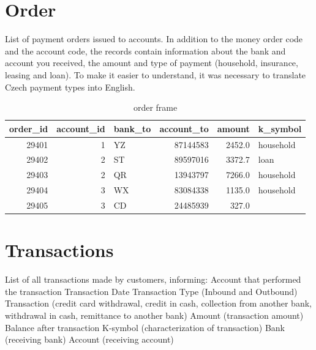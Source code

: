 \documentclass[]{book}
\begin{document}
\section{Order}\label{order}

List of payment orders issued to accounts. In addition to the money
order code and the account code, the records contain information about
the bank and account you received, the amount and type of payment
(household, insurance, leasing and loan). To make it easier to
understand, it was necessary to translate Czech payment types into
English.

\begin{table}[t]

\caption{\label{tab:unnamed-chunk-7}order frame}
\centering
\begin{tabular}{r|r|l|r|r|l}
\hline
order\_id & account\_id & bank\_to & account\_to & amount & k\_symbol\\
\hline
29401 & 1 & YZ & 87144583 & 2452.0 & household\\
\hline
29402 & 2 & ST & 89597016 & 3372.7 & loan\\
\hline
29403 & 2 & QR & 13943797 & 7266.0 & household\\
\hline
29404 & 3 & WX & 83084338 & 1135.0 & household\\
\hline
29405 & 3 & CD & 24485939 & 327.0 & \\
\hline
\end{tabular}
\end{table}

\section{Transactions}\label{transactions}

List of all transactions made by customers, informing: Account that
performed the transaction Transaction Date Transaction Type (Inbound and
Outbound) Transaction (credit card withdrawal, credit in cash,
collection from another bank, withdrawal in cash, remittance to another
bank) Amount (transaction amount) Balance after transaction K-symbol
(characterization of transaction) Bank (receiving bank) Account
(receiving account)
\end{document}
